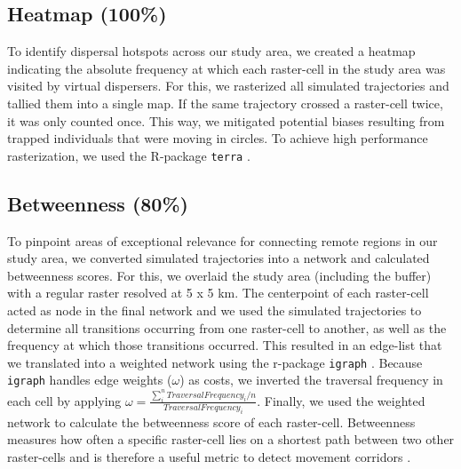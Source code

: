 \documentclass[abstract=on,10pt,a4paper,bibliography=totocnumbered]{article}
\begin{document}
\subsection{Heatmap (100\%)}
To identify dispersal hotspots across our study area, we created a heatmap
indicating the absolute frequency at which each raster-cell in the study area
was visited by virtual dispersers. For this, we rasterized all simulated
trajectories and tallied them into a single map. If the same trajectory crossed
a raster-cell twice, it was only counted once. This way, we mitigated potential
biases resulting from trapped individuals that were moving in circles. To
achieve high performance rasterization, we used the R-package {\tt terra}
\citep{Hijmans.2020}.

\subsection{Betweenness (80\%)}
To pinpoint areas of exceptional relevance for connecting remote regions in our
study area, we converted simulated trajectories into a network and calculated
betweenness scores. For this, we overlaid the study area (including the buffer)
with a regular raster resolved at 5 x 5 km. The centerpoint of each raster-cell
acted as node in the final network and we used the simulated trajectories to
determine all transitions occurring from one raster-cell to another, as well as
the frequency at which those transitions occurred. This resulted in an edge-list
that we translated into a weighted network using the r-package {\tt igraph}
\citep{Gabor.2006}. Because {\tt igraph} handles edge weights (\(\omega\)) as
costs, we inverted the traversal frequency in each cell by applying \(\omega =
\frac{\sum_i^n{Traversal Frequency_i}/n}{Traversal Frequency_i}\). Finally, we
used the weighted network to calculate the betweenness score of each
raster-cell. Betweenness measures how often a specific raster-cell lies on a
shortest path between two other raster-cells and is therefore a useful metric to
detect movement corridors \citep{BastilleRousseau.2018}.
\end{document}
